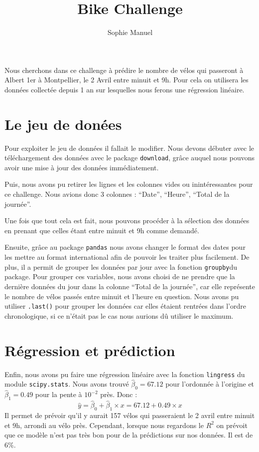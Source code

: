 \documentclass[
]{article}
\title{Bike Challenge}
\author{Sophie Manuel}
\date{}
\begin{document}
\maketitle

Nous cherchons dans ce challenge à prédire le nombre de vélos qui
passeront à Albert 1er à Montpellier, le 2 Avril entre minuit et 9h.
Pour cela on utilisera les données collectée depuis 1 an sur lesquelles
nous ferons une régression linéaire.

\hypertarget{le-jeu-de-donuxe9es}{%
\section{Le jeu de donées}\label{le-jeu-de-donuxe9es}}

Pour exploiter le jeu de données il fallait le modifier. Nous devons
débuter avec le téléchargement des données avec le package
\texttt{download}, grâce auquel nous pouvons avoir une mise à jour des
données immédiatement.

Puis, nous avons pu retirer les lignes et les colonnes vides ou
inintéressantes pour ce challenge. Nous avions donc 3 colonnes :
``Date'', ``Heure'', ``Total de la journée''.

Une fois que tout cela est fait, nous pouvons procéder à la sélection
des données en prenant que celles étant entre minuit et 9h comme
demandé.

Ensuite, grâce au package \texttt{pandas} nous avons changer le format
des dates pour les mettre au format international afin de pouvoir les
traiter plus facilement. De plus, il a permit de grouper les données par
jour avec la fonction \texttt{groupby}du package. Pour grouper ces
variables, nous avons choisi de ne prendre que la dernière données du
jour dans la colonne ``Total de la journée'', car elle représente le
nombre de vélos passés entre minuit et l'heure en question. Nous avons
pu utiliser \texttt{.last()} pour grouper les données car elles étaient
rentrées dans l'ordre chronologique, si ce n'était pas le cas nous
aurions dû utiliser le maximum.

\hypertarget{ruxe9gression-et-pruxe9diction}{%
\section{Régression et
prédiction}\label{ruxe9gression-et-pruxe9diction}}

Enfin, nous avons pu faire une régression linéaire avec la fonction
\texttt{lingress} du module \texttt{scipy.stats}. Nous avons trouvé
\(\hat\beta_0=67.12\) pour l'ordonnée à l'origine et
\(\hat\beta_1=0.49\) pour la pente à \(10^{-2}\) près. Donc : \[
 \hat y = \hat\beta_0 + \hat\beta_1 \times x = 67.12 + 0.49 \times x
 \] Il permet de prévoir qu'il y aurait 157 vélos qui passeraient le 2
avril entre minuit et 9h, arrondi au vélo près. Cependant, lorsque nous
regardons le \(R^2\) on prévoit que ce modèle n'est pas très bon pour de
la prédictions sur nos données. Il est de \(6\%\).
\end{document}
